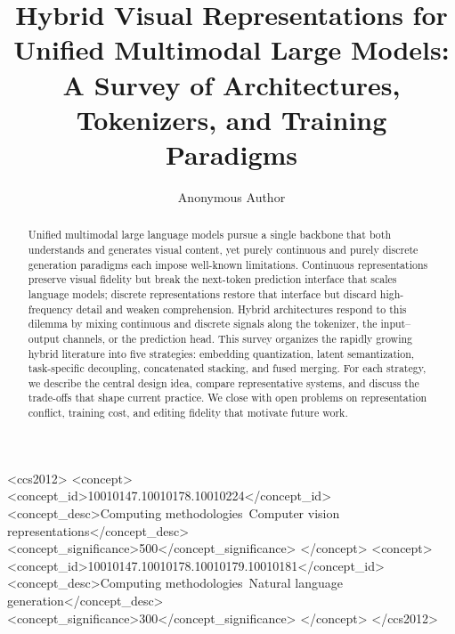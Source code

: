 \documentclass[manuscript,screen,review]{acmart}
\begin{document}
\title{Hybrid Visual Representations for Unified Multimodal Large Models:
A Survey of Architectures, Tokenizers, and Training Paradigms}

\author{Anonymous Author}

\renewcommand{\shortauthors}{Anonymous}

\begin{abstract}
Unified multimodal large language models pursue a single backbone that
both understands and generates visual content, yet purely continuous and
purely discrete generation paradigms each impose well-known
limitations. Continuous representations preserve visual fidelity but
break the next-token prediction interface that scales language models;
discrete representations restore that interface but discard
high-frequency detail and weaken comprehension. Hybrid architectures
respond to this dilemma by mixing continuous and discrete signals along
the tokenizer, the input--output channels, or the prediction head. This
survey organizes the rapidly growing hybrid literature into five
strategies: embedding quantization, latent semantization, task-specific
decoupling, concatenated stacking, and fused merging. For each strategy,
we describe the central design idea, compare representative systems,
and discuss the trade-offs that shape current practice. We close with
open problems on representation conflict, training cost, and editing
fidelity that motivate future work.
\end{abstract}

\begin{CCSXML}
<ccs2012>
 <concept>
  <concept_id>10010147.10010178.10010224</concept_id>
  <concept_desc>Computing methodologies~Computer vision representations</concept_desc>
  <concept_significance>500</concept_significance>
 </concept>
 <concept>
  <concept_id>10010147.10010178.10010179.10010181</concept_id>
  <concept_desc>Computing methodologies~Natural language generation</concept_desc>
  <concept_significance>300</concept_significance>
 </concept>
</ccs2012>
\end{CCSXML}


\end{document}
